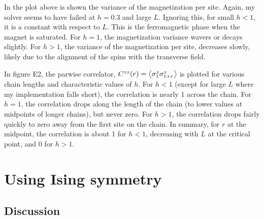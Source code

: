\documentclass{article}
\begin{document}
{\centering



}

In the plot above is shown the variance of the magnetization per site.
Again, my solver seems to have failed at $h=0.3$ and large $L$.
Ignoring this, for small $h<1$, it is a constant with respect to $L$.
This is the ferromagnetic phase when the magnet is saturated.
For $h=1$, the magnetization variance wavers or decays slightly.
For $h>1$, the variance of the magnetization per site, decreases slowly,
likely due to the alignment of the spins with the transverse field.

In figure E2, the parwise correlator, $C^{zz}(r) = \ev{\sigma^z_1 \sigma^z_{1+r}}$
is plotted for various chain lengths and characteristic values of $h$.
For $h<1$ (except for large $L$ where my implementation falls short),
the correlation is nearly 1 across the chain.
For $h=1$, the correlation drops along the length of the chain (to lower
values at midpoints of longer chains), but never zero.
For $h>1$, the correlation drops fairly quickly to zero away from the first
site on the chain.
In summary, for $r$ at the midpoint, the correlation is about 1 for $h<1$,
decreasing with $L$ at the critical point, and 0 for $h>1$.

{\centering



}

\newpage

\section{
Using Ising symmetry
}

\subsection{
Discussion
}
\end{document}
